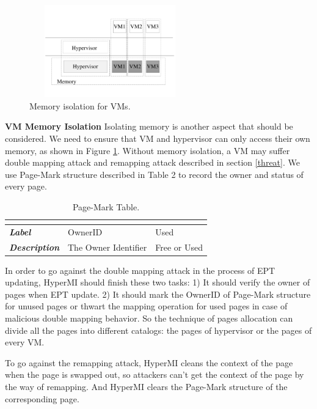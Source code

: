 \documentclass[conference]{IEEEtran}
\begin{document}
\begin{figure}
\centerline{\includegraphics[width=7cm, height=4cm]{pdfvmcs3.pdf}}%
\caption{Memory isolation for VMs.} \label{fig3}
\end{figure}


\textbf{VM Memory Isolation}
Isolating memory is another aspect that should be considered. We need to ensure that VM and hypervisor can only access their own memory, as shown in Figure \ref{fig3}.
Without memory isolation, a VM may suffer double mapping attack and remapping attack described in section \ref{threat}. We use Page-Mark structure described in Table 2 to record the owner and status of every page. 

\begin{table}
\centering
\caption{Page-Mark Table.}\label{tab2}
\begin{tabular}{p{1.2cm}|p{1.4cm}|p{1.5cm}}
\hline
\multicolumn{3}{c}{\bfseries\textbf\centering{Page-Mark Table}}\\
\hline
{\itshape\bfseries Label} & OwnerID & Used \\
\hline
{\itshape\bfseries Description} & The Owner Identifier & Free or Used \\
\hline
\end{tabular}
\end{table}

In order to go against the double mapping attack in the process of EPT updating, HyperMI should finish these two tasks: 1) It should verify the owner of pages when EPT update. 2) It should mark the OwnerID of Page-Mark structure for unused pages or thwart the mapping operation for used pages in case of malicious double mapping behavior. So the technique of pages allocation can divide all the pages into different catalogs: the pages of hypervisor or the pages of every VM.

To go against the remapping attack, HyperMI cleans the context of the page when the page is swapped out, so attackers can't get the context of the page by the way of remapping. And HyperMI clears the Page-Mark structure of the corresponding page. 
\end{document}
